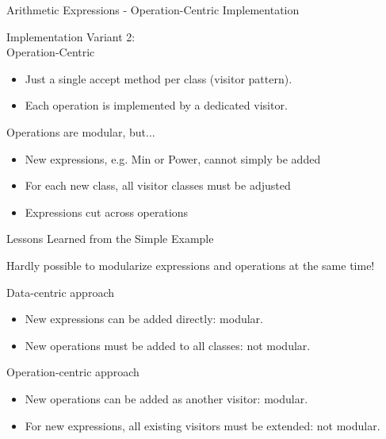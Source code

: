 \begin{frame}{Arithmetic Expressions - Operation-Centric Implementation}
	\begin{mycolumns}[widths={40}]
		\begin{definition}{Implementation Variant 2:\\Operation-Centric}
			\begin{itemize}
				\item Just a single accept method per class (visitor pattern).
				\item Each operation is implemented by a dedicated visitor.				
			\end{itemize}
		\end{definition}
		\pause
		\begin{note}{Operations are modular, but...}
			\begin{itemize}
				\item New expressions, e.g. Min or Power, cannot simply be added
				\item For each new class, all visitor classes must be adjusted
				\item Expressions cut across operations
			\end{itemize}
		\end{note}
	\mynextcolumn
		\begin{exampletight}{}
		\end{exampletight}
	\end{mycolumns}
\end{frame}

\begin{frame}{Lessons Learned from the Simple Example}
	\begin{note}{}
		Hardly possible to modularize expressions and operations at the same time!
	\end{note}
	\pause
	\begin{mycolumns}
		\begin{note}{Data-centric approach}
			\begin{itemize}
				\item New expressions can be added directly: modular.
				\item New operations must be added to all classes: not modular.
			\end{itemize}
		\end{note}
	\mynextcolumn
		\begin{note}{Operation-centric approach}
			\begin{itemize}
				\item New operations can be added as another visitor: modular.
				\item For new expressions, all existing visitors must be extended: not modular.
			\end{itemize}
		\end{note}	
	\end{mycolumns}
\end{frame}